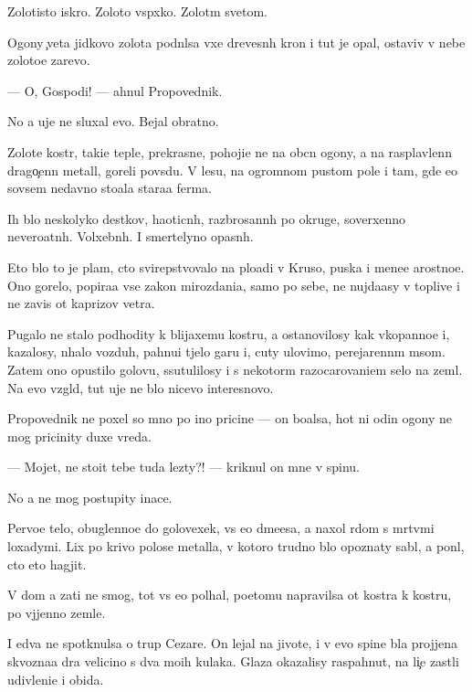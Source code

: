 \documentclass[10pt]{book}
\begin{document}
Zolotisto{\y} iskro{\y}. Zoloto{\y} vsp{\yi}xko{\y}. Zolot{\yi}m svetom.

Ogony {\c}veta jidkovo zolota podn{\ia}lsa v{\yi}xe drevesn{\yi}h kron i tut je opal, ostaviv v nebe zoloto{\y}e zarevo.

— O, Gospodi! — ahnul Propovednik.

No {\y}a uje ne sluxal {\y}evo. Bejal obratno.



Zolot{\yi}{\y}e kostr{\yi}, taki{\y}e tepl{\yi}{\y}e, prekrasn{\yi}{\y}e, pohoji{\y}e ne na ob{\yi}cn{\yi}{\y} ogony, a na rasplavlenn{\yi}{\y} drago{\c}enn{\yi}{\y} metall, goreli povs{\iu}du. V lesu, na ogromnom pustom pole i tam, gde {\y}e{\x}o sovsem nedavno sto{\y}ala stara{\y}a ferma.

Ih b{\yi}lo neskolyko des{\ia}tkov, haoticn{\yi}h, razbrosann{\yi}h po okruge, soverxenno nevero{\y}atn{\yi}h. Volxebn{\yi}h. I smertelyno opasn{\yi}h.

Eto b{\yi}lo to je plam{\ia}, cto svirepstvovalo na plo{\x}adi v Kruso, puska{\y} i mene{\y}e {\y}arostno{\y}e. Ono gorelo, popira{\y}a vse zakon{\yi} mirozdani{\y}a, samo po sebe, ne nujda{\y}asy v toplive i ne zavis{\ia} ot kaprizov vetra.

Pugalo ne stalo podhodity k blija{\y}xemu kostru, a ostanovilosy kak vkopanno{\y}e i, kazalosy, n{\iu}halo vozduh, pahnu{\x}i{\y} t{\ia}jelo{\y} gar{\y}u i, cuty ulovimo, perejarenn{\yi}m m{\ia}som. Zatem ono opustilo golovu, ssutulilosy i s nekotor{\yi}m razocarovani{\y}em selo na zeml{\iu}. Na {\y}evo vzgl{\ia}d, tut uje ne b{\yi}lo nicevo interesnovo.

Propovednik ne poxel so mno{\y} po ino{\y} pricine — on bo{\y}alsa, hot{\ia} ni odin ogony ne mog pricinity duxe vreda.

— Mojet, ne sto{\y}it tebe tuda lezty?! — kriknul on mne v spinu.

No {\y}a ne mog postupity inace.

Pervo{\y}e telo, obuglenno{\y}e do golovexek, vs{\e} {\y}e{\x}o d{\yi}m{\ia}{\x}e{\y}esa, {\y}a naxol r{\ia}dom s m{\e}rtv{\yi}mi loxadymi. Lix po krivo{\y} polose metalla, v kotoro{\y} trudno b{\yi}lo opoznaty sabl{\iu}, {\y}a pon{\ia}l, cto eto hagjit.

V dom {\y}a za{\y}ti ne smog, tot vs{\e} {\y}e{\x}o pol{\yi}hal, poetomu napravilsa ot kostra k kostru, po v{\yi}jjenno{\y} zemle.

I {\y}edva ne spotknulsa o trup Cezare. On lejal na jivote, i v {\y}evo spine b{\yi}la projjena skvozna{\y}a d{\yi}ra velicino{\y} s dva mo{\y}ih kulaka. Glaza okazalisy raspahnut{\yi}, na li{\c}e zast{\yi}li udivleni{\y}e i obida.
\end{document}
